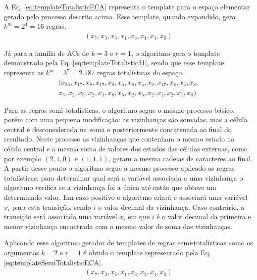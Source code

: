 A Eq. \eqref{eq:templateTotalisticECA} representa o template para o espaço elementar gerado pelo processo descrito acima. Esse template, quando expandido, gera $k^m = 2^4 = 16$ regras.
\begin{equation}
\begin{split}
(x_7,x_3,x_3,x_1,x_3,x_1,x_1,x_0)
\label{eq:templateTotalisticECA}
\end{split}
\end{equation}

Já para a família de ACs de $k=3$ e $r=1$, o algoritmo gera o template demonstrado pela Eq. \eqref{eq:templateTotalistic31}, sendo que esse template representa as $k^m = 3^7 = 2.187$ regras totalísticas do espaço.
\begin{equation}
\begin{split}
(x_{26},x_{17},x_8,x_{17},x_8,x_5,x_8,x_5,x_2,x_{17},x_8,x_5,x_8,\\
x_5,x_2,x_5,x_2,x_1,x_8,x_5,x_2,x_5,x_2,x_1,x_2,x_1,x_0)
\label{eq:templateTotalistic31}
\end{split}
\end{equation}

Para as regras semi-totalísticas, o algoritmo segue o mesmo processo básico, porém com uma pequena modificação: as vizinhanças são somadas, mas a célula central é desconsiderada na soma e posteriormente concatenada ao final do resultado. Neste processo as vizinhanças que contenham o mesmo estado na célula central e a mesma soma de valores dos estados das células externas, como por exemplo $(2,1,0)$ e $(1,1,1)$, geram a mesma cadeias de caracteres ao final. A partir desse ponto o algoritmo segue a mesmo processo aplicado as regras totalísticas: para determinar qual será a variável associada a uma vizinhança o algoritmo verifica se a vizinhança foi a única até então que obteve um determinado valor. Em caso positivo o algoritmo criará e associará uma variável $x_i$ para esta transição, sendo $i$ o valor decimal da vizinhança. Caso contrário, a transição será associada uma variável $x_i$ em que $i$ é o valor decimal da primeira e menor vizinhança encontrada com o mesmo valor de soma das vizinhanças.

Aplicando esse algoritmo gerador de templates de regras semi-totalísticas como os argumentos $k=2$ e $r=1$ é obtido o template representado pela Eq. \eqref{eq:templateSemiTotalisticECA}.
\begin{equation}
\begin{split}
(x_7,x_3,x_5,x_1,x_3,x_2,x_1,x_0)
\label{eq:templateSemiTotalisticECA}
\end{split}
\end{equation}


